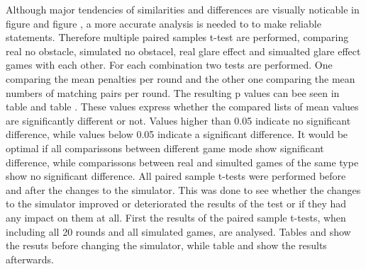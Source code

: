 Although major tendencies of similarities and differences are visually noticable in figure  and figure , a more accurate analysis is needed to to make reliable statements. Therefore multiple paired samples t-test are performed, comparing real no obstacle, simulated no obstacel, real glare effect and simualted glare effect games with each other. For each combination two tests are performed. One comparing the mean penalties per round and the other one comparing the mean numbers of matching pairs per round. The resulting p values can bee seen in table  and table . These values express whether the compared lists of mean values are significantly different or not. Values higher than 0.05 indicate no significant difference, while values below 0.05 indicate a significant difference. It would be optimal if all comparissons between different game mode show significant difference, while comparissons between real and simulted games of the same type show no significant difference. All paired sample t-tests were performed before and after the changes to the simulator. This was done to see whether the changes to the simulator improved or deteriorated the results of the test or if they had any impact on them at all. First the results of the paired sample t-tests, when including all 20 rounds and all simulated games, are analysed. Tables  and  show the resuts before changing the simulator, while table  and  show the results afterwards.


